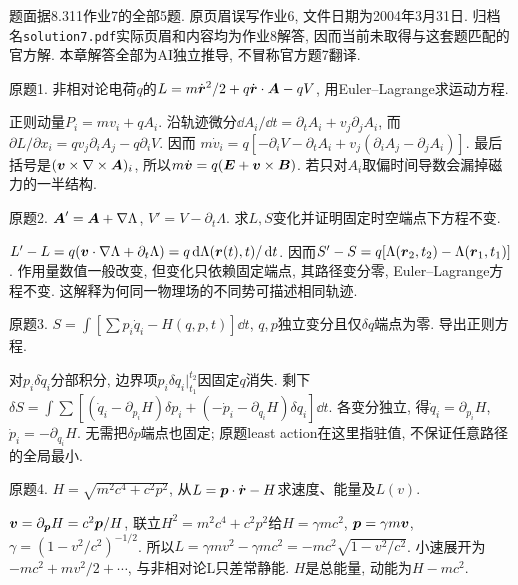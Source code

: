 题面据8.311作业7的全部5题. 原页眉误写作业6, 文件日期为2004年3月31日. 归档名\texttt{solution7.pdf}实际页眉和内容均为作业8解答, 因而当前未取得与这套题匹配的官方解. 本章解答全部为AI独立推导, 不冒称官方题7翻译.
\begin{exercise}
原题1. 非相对论电荷$q$的$L=m\dot{\boldsymbol{r}}^2/2+q\dot{\boldsymbol{r}}\cdot\boldsymbol{A}-qV$, 用Euler--Lagrange求运动方程.
\end{exercise}
\begin{solution}
正则动量$P_i=mv_i+qA_i$. 沿轨迹微分$\dd A_i/\dd t=\partial_tA_i+v_j\partial_jA_i$, 而$\partial L/\partial x_i=qv_j\partial_iA_j-q\partial_iV$. 因而
$m\dot v_i=q[-\partial_iV-\partial_tA_i+v_j(\partial_iA_j-\partial_jA_i)]$. 最后括号是$(\boldsymbol{v}\times\nabla\times\boldsymbol{A})_i$, 所以$m\dot{\boldsymbol{v}}=q(\boldsymbol{E}+\boldsymbol{v}\times\boldsymbol{B})$. 若只对$A_i$取偏时间导数会漏掉磁力的一半结构.
\end{solution}
\begin{exercise}
原题2. $\boldsymbol{A}'=\boldsymbol{A}+\nabla\Lambda$, $V'=V-\partial_t\Lambda$. 求$L,S$变化并证明固定时空端点下方程不变.
\end{exercise}
\begin{solution}
$L'-L=q(\boldsymbol{v}\cdot\nabla\Lambda+\partial_t\Lambda)=q\,\mathrm d\Lambda(\boldsymbol{r}(t),t)/\,\mathrm d t$. 因而$S'-S=q[\Lambda(\boldsymbol{r}_2,t_2)-\Lambda(\boldsymbol{r}_1,t_1)]$. 作用量数值一般改变, 但变化只依赖固定端点, 其路径变分零, Euler--Lagrange方程不变. 这解释为何同一物理场的不同势可描述相同轨迹.
\end{solution}
\begin{exercise}
原题3. $S=\int[\sum p_i\dot q_i-H(q,p,t)]\dd t$, $q,p$独立变分且仅$\delta q$端点为零. 导出正则方程.
\end{exercise}
\begin{solution}
对$p_i\delta\dot q_i$分部积分, 边界项$p_i\delta q_i|_{t_1}^{t_2}$因固定$q$消失. 剩下
$\delta S=\int\sum[(\dot q_i-\partial_{p_i}H)\delta p_i+(-\dot p_i-\partial_{q_i}H)\delta q_i]\dd t$. 各变分独立, 得$\dot q_i=\partial_{p_i}H$, $\dot p_i=-\partial_{q_i}H$. 无需把$\delta p$端点也固定; 原题least action在这里指驻值, 不保证任意路径的全局最小.
\end{solution}
\begin{exercise}
原题4. $H=\sqrt{m^2c^4+c^2p^2}$, 从$L=\boldsymbol{p}\cdot\dot{\boldsymbol{r}}-H$求速度、能量及$L(v)$.
\end{exercise}
\begin{solution}
$\boldsymbol{v}=\partial_{\boldsymbol{p}}H=c^2\boldsymbol{p}/H$, 联立$H^2=m^2c^4+c^2p^2$给$H=\gamma mc^2$, $\boldsymbol{p}=\gamma m\boldsymbol{v}$, $\gamma=(1-v^2/c^2)^{-1/2}$. 所以$L=\gamma mv^2-\gamma mc^2=-mc^2\sqrt{1-v^2/c^2}$. 小速展开为$-mc^2+mv^2/2+\cdots$, 与非相对论L只差常静能. $H$是总能量, 动能为$H-mc^2$.
\end{solution}
